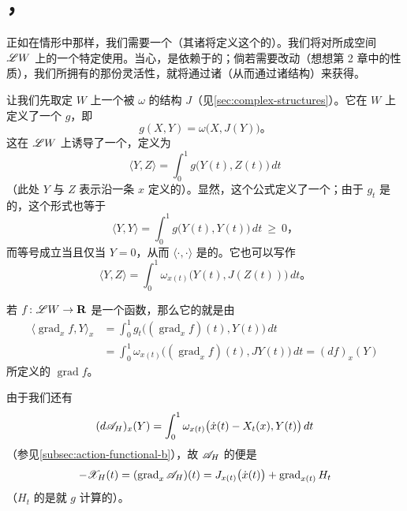 
\section{\trGradient，\trFloerEquation}
\label{sec:gradient-floer-equation}

正如在\trMorse{}情形中那样，我们需要一个\trVectorField（其诸\trTrajectory{}将定义这个\trComplex{}的\trDifferential）。我们将对\trContractible\trLoop{}所成空间 $\mathscr{L}W$ 上的一个特定\trMetric{}使用\trGradient。当心，\trGradient{}是依赖于\trMetric{}的；倘若需要改动\trVectorField（想想第 2 章中的\trSmale{}性质），我们所拥有的那份灵活性，就将通过诸\trMetric（从而通过诸\trAlmostComplex{}结构）来获得。

让我们先取定 $W$ 上一个被 $\omega$ \trCalibrated{}的\trAlmostComplex{}结构 $J$（见\cref{sec:complex-structures}）。它在 $W$ 上定义了一个\trRiemann\trMetric{} $g$，即
\[
g(X,Y)=\omega\bigl(X,J(Y)\bigr)\text{。}
\]
这在 $\mathscr{L}W$ 上诱导了一个\trMetric，定义为
\[
\langle Y,Z\rangle=\int_0^1g\bigl(Y(t),Z(t)\bigr)\,dt
\]
（此处 $Y$ 与 $Z$ 表示沿一条\trLoop{} $x$ 定义的\trVectorField）。显然，这个公式定义了一个\trSymmetricBilinearForm；由于 $g_t$ 是\trPositiveDefinite{}的，这个形式也等于
\[
\langle Y,Y\rangle=\int_0^1g\bigl(Y(t),Y(t)\bigr)\,dt\ \ge\ 0\text{，}
\]
而等号成立当且仅当 $Y=0$，从而 $\langle\cdot,\cdot\rangle$ 是\trPositiveDefinite{}的。它也可以写作
\[
\langle Y,Z\rangle=\int_0^1\omega_{x(t)}\bigl(Y(t),J(Z(t))\bigr)\,dt\text{。}
\]

若 $f\colon\mathscr{L}W\to\mathbf{R}$ 是一个函数，那么它的\trGradient{}就是由
\[
\begin{aligned}
\langle\operatorname{grad}_x f,Y\rangle_x
&=\int_0^1g_t\bigl((\operatorname{grad}_x f)(t),Y(t)\bigr)\,dt\\
&=\int_0^1\omega_{x(t)}\bigl((\operatorname{grad}_x f)(t),JY(t)\bigr)\,dt=(df)_x(Y)
\end{aligned}
\]
所定义的\trVectorField{} $\operatorname{grad}f$。

由于我们还有
\[
(d\mathscr{A}_H)_x(Y)=\int_0^1\omega_{x(t)}\bigl(\dot{x}(t)-X_t(x),Y(t)\bigr)\,dt
\]
（参见\cref{subsec:action-functional-b}），故 $\mathscr{A}_H$ 的\trGradient{}便是
\[
-\mathscr{X}_H(t)=(\operatorname{grad}_x\mathscr{A}_H)(t)=J_{x(t)}\bigl(\dot{x}(t)\bigr)+\operatorname{grad}_{x(t)}H_t
\]
（$H_t$ 的\trGradient{}是就\trMetric{} $g$ 计算的）。

